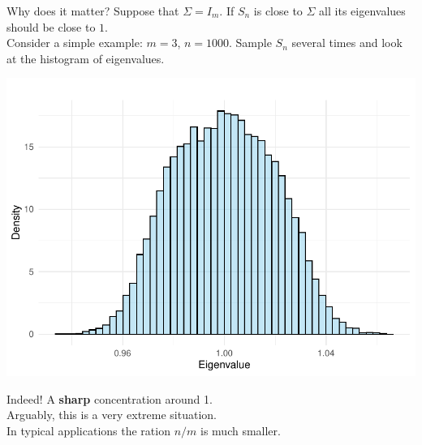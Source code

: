 \documentclass[11pt,handout,aspectratio=169]{beamer}
\begin{document}
\begin{frame}{Why does it matter?}
	Suppose that $\Sigma=I_m$. If $S_n$ is close to $\Sigma$ all its eigenvalues should be close to $1$. \\[5mm]
	Consider a simple example: $m=3$, $n=1000$. Sample $S_n$ several times and look at the histogram of eigenvalues. \\
	\begin{minipage}{7cm}
	\includegraphics[scale=.45]{pics/HDcov3}		
	\end{minipage}
\begin{minipage}{6.5cm}
	Indeed! A \textbf{sharp} concentration around 1.\\[5mm]
	Arguably, this is a very extreme situation.\\[5mm]
	In typical applications the ration $n/m$ is much smaller. 
\end{minipage}
\end{frame}
\end{document}
